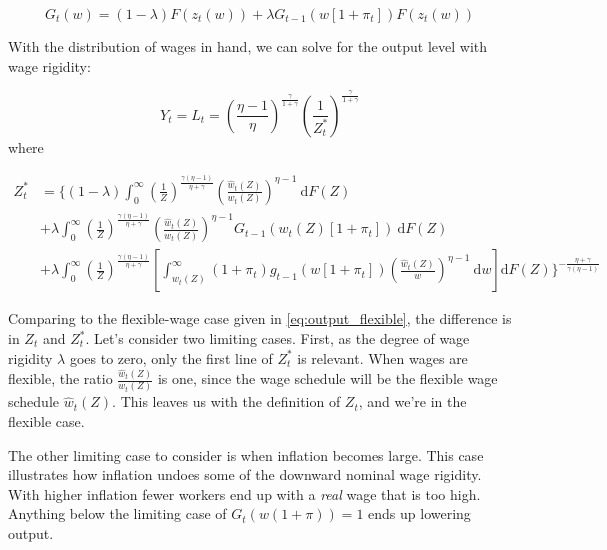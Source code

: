 \documentclass[12pt,a4paper]{scrartcl}            %
\begin{document}
\begin{equation}
    \label{eq:wage_distribution}
    G_t(w) = (1 - \lambda) F(z_t(w)) + \lambda G_{t-1}\left(w[1 + \pi_t]\right)F(z_t(w))
\end{equation}

With the distribution of wages in hand, we can solve for the output level with wage rigidity:

\begin{equation}
    \label{eq:output_rigid}
    Y_t = L_t = \left(\frac{\eta - 1}{\eta} \right)^{\frac{\gamma}{1 + \gamma}}\left( \frac{1}{Z_t^*} \right)^{\frac{\gamma}{1 + \gamma}}
\end{equation}
%
where

\begin{equation}
    \label{eq:z_star}
    \begin{split}
    Z_t^* &= \Big\{(1 - \lambda) \int_{0}^{\infty} \! \left( \frac{1}{Z} \right)^{\frac{\gamma(\eta - 1)}{\eta + \gamma}} \left( \frac{\hat{w}_t(Z)}{w_t(Z)} \right)^{\eta - 1}\ \mathrm{d}F(Z) \\
          &+            \lambda  \int_{0}^{\infty} \! \left( \frac{1}{Z} \right)^{\frac{\gamma(\eta - 1)}{\eta + \gamma}} \left( \frac{\hat{w}_t(Z)}{w_t(Z)} \right)^{\eta - 1} G_{t-1}\left( w_t(Z)[1 + \pi_t] \right)                                                     \ \mathrm{d}F(Z)\\
          &+            \lambda  \int_{0}^{\infty} \! \left( \frac{1}{Z} \right)^{\frac{\gamma(\eta - 1)}{\eta + \gamma}} \left[ \int_{w_t(Z)}^{\infty} (1 + \pi_t)g_{t-1}\left( w[1 + \pi_t] \right) \left( \frac{\hat{w}_t(Z)}{w} \right)^{\eta - 1}\ \mathrm{d}w \right] \mathrm{d}F(Z)
            \Big\}^{-\frac{\eta + \gamma}{\gamma(\eta - 1)}}
    \end{split}
\end{equation}

Comparing to the flexible-wage case given in \eqref{eq:output_flexible}, the difference is in $Z_t$ and $Z_t^*$.
Let's consider two limiting cases.
First, as the degree of wage rigidity $\lambda$ goes to zero, only the first line of $Z_t^*$ is relevant.
When wages are flexible, the ratio $\frac{\hat{w}_t(Z)}{w_t(Z)}$ is one, since the wage schedule will be the flexible wage schedule $\hat{w}_t(Z)$.  %
This leaves us with the definition of $Z_t$, and we're in the flexible case.

The other limiting case to consider is when inflation becomes large.
This case illustrates how inflation undoes some of the downward nominal wage rigidity.
With higher inflation fewer workers end up with a \emph{real} wage that is too high.
Anything below the limiting case of $G_t(w (1 + \pi)) = 1$ ends up lowering output.  %
\end{document}
